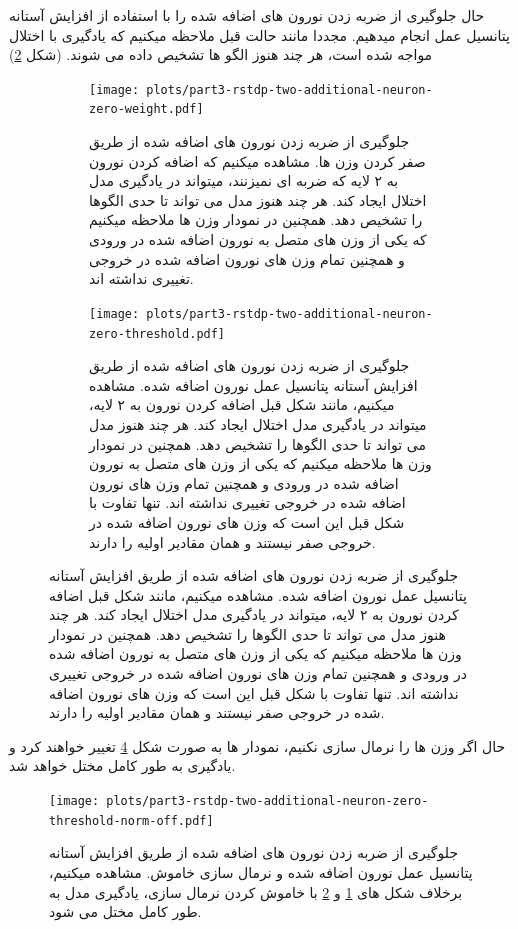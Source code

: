         حال جلوگیری از ضربه زدن نورون های اضافه شده را با استفاده از افزایش آستانه پتانسیل عمل انجام میدهیم. مجددا مانند حالت قبل ملاحظه میکنیم که یادگیری با اختلال مواجه شده است، هر چند هنوز الگو ها تشخیص داده می شوند.
        (شکل 
        \ref{fig:part3-rstdp-two-additional-neuron-zero-threshold})
        \begin{figure}[htbp]
            \centering
            \begin{subfigure}[b]{\linewidth}
                \centering
                \captionsetup{width=.9\linewidth}
                \texttt{[image: plots/part3-rstdp-two-additional-neuron-zero-weight.pdf]} 
                \caption{جلوگیری از ضربه زدن نورون های اضافه شده از طریق صفر کردن وزن ها. مشاهده میکنیم که اضافه کردن نورون به ۲ لایه که ضربه ای نمیزنند، میتواند در یادگیری مدل اختلال ایجاد کند. هر چند هنوز مدل می تواند تا حدی الگوها را تشخیص دهد. همچنین در نمودار وزن ها ملاحظه میکنیم که یکی از وزن های متصل به نورون اضافه شده در ورودی و همچنین تمام وزن های نورون اضافه شده در خروجی تغییری نداشته اند.
                }
                \label{fig:part3-rstdp-two-additional-neuron-zero-weight}
            \end{subfigure}
            \begin{subfigure}[b]{\linewidth}
                \centering
                \captionsetup{width=.9\linewidth}
                \texttt{[image: plots/part3-rstdp-two-additional-neuron-zero-threshold.pdf]} 
                \caption{جلوگیری از ضربه زدن نورون های اضافه شده از طریق افزایش آستانه پتانسیل عمل نورون اضافه شده. مشاهده میکنیم، مانند شکل قبل اضافه کردن نورون به ۲ لایه، میتواند در یادگیری مدل اختلال ایجاد کند. هر چند هنوز مدل می تواند تا حدی الگوها را تشخیص دهد. همچنین در نمودار وزن ها ملاحظه میکنیم که یکی از وزن های متصل به نورون اضافه شده در ورودی و همچنین تمام وزن های نورون اضافه شده در خروجی تغییری نداشته اند. تنها تفاوت با شکل قبل این است که وزن های نورون اضافه شده در خروجی صفر نیستند و همان مقادیر اولیه را دارند.
                }
                \label{fig:part3-rstdp-two-additional-neuron-zero-threshold}
            \end{subfigure}
            \label{fig:part3-rstdp-two-additional-neuron}
        \end{figure}

        حال اگر وزن ها را نرمال سازی نکنیم، نمودار ها به صورت شکل 
        \ref{fig:part3-rstdp-two-additional-neuron-zero-threshold-norm-off}
        تغییر خواهند کرد و یادگیری به طور کامل مختل خواهد شد.
        \begin{figure}[H]
            \centering
            \texttt{[image: plots/part3-rstdp-two-additional-neuron-zero-threshold-norm-off.pdf]} 
            \caption{
                جلوگیری از ضربه زدن نورون های اضافه شده از طریق افزایش آستانه پتانسیل عمل نورون اضافه شده و نرمال سازی خاموش. مشاهده میکنیم، برخلاف شکل های 
                \ref{fig:part3-rstdp-two-additional-neuron-zero-weight} 
                و 
                \ref{fig:part3-rstdp-two-additional-neuron-zero-threshold} 
                با خاموش کردن نرمال سازی، یادگیری مدل به طور کامل مختل می شود.
            }
            \label{fig:part3-rstdp-two-additional-neuron-zero-threshold-norm-off}
        \end{figure}
    \clearpage
